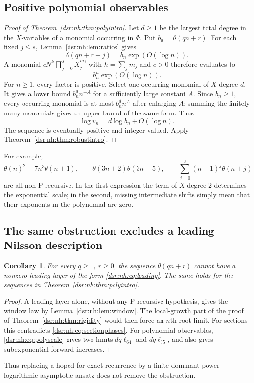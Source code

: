 \documentclass[11pt,a4paper]{article}
\numberwithin{equation}{section}
\newtheorem{corollary}[theorem]{Corollary}
\theoremstyle{definition}
\theoremstyle{remark}
\newcommand{\tht}{\theta}
\theoremstyle{definition}
\theoremstyle{plain}
\begin{document}
\subsection{Positive polynomial observables}
\begin{proof}[Proof of Theorem~\ref{dsr:nh:thm:polyintro}]
Let $d\ge1$ be the largest total degree in the $X$-variables of a monomial
occurring in $\Phi$. Put $b_n=\tht(qn+r)$. For each fixed $j\le s$,
Lemma~\ref{dsr:nh:lem:ratios} gives
\[
\tht(qn+r+j)=b_n\exp(O(\log n)).
\]
A monomial $cN^k\prod_{j=0}^{s}X_j^{m_j}$ with
$h=\sum_jm_j$ and $c>0$ therefore evaluates to
\[
b_n^h\exp(O(\log n)).
\]
For $n\ge1$, every factor is positive. Select one occurring monomial of
$X$-degree $d$. It gives a lower bound $b_n^dn^{-A}$ for a sufficiently
large constant $A$. Since $b_n\ge1$, every occurring monomial is at most
$b_n^dn^A$ after enlarging $A$; summing the finitely many monomials gives
an upper bound of the same form. Thus
\begin{equation}
\log v_n=d\log b_n+O(\log n).
\label{dsr:nh:eq:polyscale}
\end{equation}
The sequence is eventually positive and integer-valued. Apply
Theorem~\ref{dsr:nh:thm:robustintro}.
\end{proof}
For example,
\[
\tht(n)^2+7n^3\tht(n+1),\qquad
\tht(3n+2)\tht(3n+5),\qquad
\sum_{j=0}^{s}(n+1)^j\tht(n+j)
\]
are all non-P-recursive. In the first expression the term of $X$-degree
$2$ determines the exponential scale; in the second, missing intermediate
shifts simply mean that their exponents in the polynomial are zero.

\subsection{The same obstruction excludes a leading Nilsson description}
\begin{corollary}
\label{dsr:nh:cor:notnilsson}
For every $q\ge1$, $r\ge0$, the sequence $\tht(qn+r)$ cannot have a
nonzero leading layer of the form \eqref{dsr:nh:eq:leading}. The same holds for
the sequences in Theorem~\ref{dsr:nh:thm:polyintro}.
\end{corollary}
\begin{proof}
A leading layer alone, without any P-recursive hypothesis, gives the
window law by Lemma~\ref{dsr:nh:lem:window}. The local-growth part of the proof of
Theorem~\ref{dsr:nh:thm:rigidity} would then force an $n$th-root limit. For sections
this contradicts \eqref{dsr:nh:eq:sectionphases}. For polynomial observables,
\eqref{dsr:nh:eq:polyscale} gives two limits $dq\ell_{64}$ and $dq\ell_{75}$,
and also gives subexponential forward increases.
\end{proof}
Thus replacing a hoped-for exact recurrence by a finite dominant
power-logarithmic asymptotic ansatz does not remove the obstruction.
\end{document}

